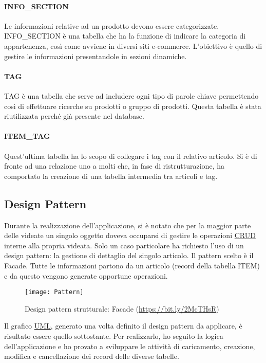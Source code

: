 \paragraph{INFO\_SECTION}
Le informazioni relative ad un prodotto devono essere categorizzate. INFO\_SECTION è una tabella che ha la funzione di indicare la categoria di appartenenza, così come avviene in diversi siti e-commerce. L'obiettivo è quello di gestire le informazioni presentandole in sezioni dinamiche. 

\paragraph{TAG}
TAG è una tabella che serve ad includere ogni tipo di parole chiave permettendo così di effettuare ricerche su prodotti o gruppo di prodotti. Questa tabella è stata riutilizzata perché già presente nel database.

\paragraph{ITEM\_TAG}
Quest'ultima tabella ha lo scopo di collegare i tag con il relativo articolo. Si è di fronte ad una relazione uno a molti che, in fase di ristrutturazione, ha comportato la creazione di una tabella intermedia tra articoli e tag.



\subsection{Design Pattern}
Durante la realizzazione dell'applicazione, si è notato che per la maggior parte delle videate un singolo oggetto doveva occuparsi di gestire le operazioni \hyperref[CRUD]{CRUD} interne alla propria videata. Solo un caso particolare ha richiesto l'uso di un design pattern: la gestione di dettaglio del singolo articolo.
Il pattern scelto è il Facade. Tutte le informazioni partono da un articolo (record della tabella ITEM) e da questo vengono generate opportune operazioni.\\

\begin{figure}[!h] 
	\centering 
	\texttt{[image: Pattern]} 
	\caption{Design pattern strutturale: Facade (\url{https://bit.ly/2McTHsR})}
	\label{Pattern}
\end{figure}


Il grafico \hyperref[UMLl]{UML}, generato una volta definito il design pattern da applicare, è risultato essere quello sottostante. Per realizzarlo, ho seguito la logica dell'applicazione e ho provato a sviluppare le attività di caricamento, creazione, modifica e cancellazione dei record delle diverse tabelle.

